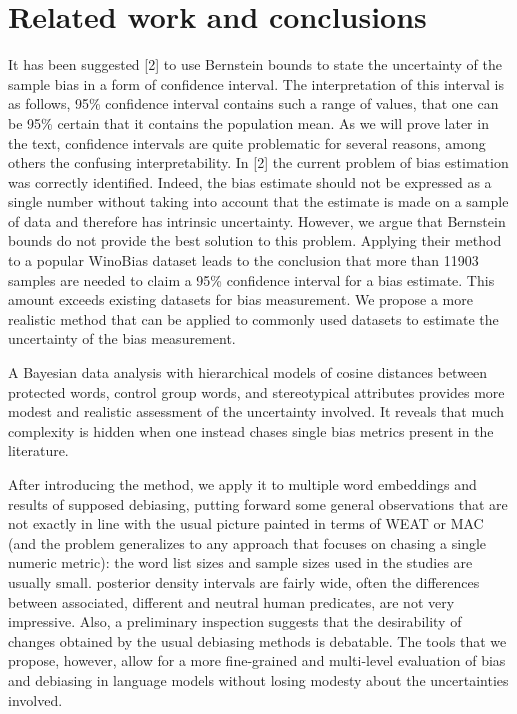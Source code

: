 \documentclass[
  12pt,
  dvipsnames,enabledeprecatedfontcommands]{scrartcl}
\begin{document}
\hypertarget{related-work-and-conclusions}{%
\section{Related work and
conclusions}\label{related-work-and-conclusions}}

\label{sec:related}

It has been suggested {[}2{]} to use Bernstein bounds to state the
uncertainty of the sample bias in a form of confidence interval. The
interpretation of this interval is as follows, 95\% confidence interval
contains such a range of values, that one can be 95\% certain that it
contains the population mean. As we will prove later in the text,
confidence intervals are quite problematic for several reasons, among
others the confusing interpretability. In {[}2{]} the current problem of
bias estimation was correctly identified. Indeed, the bias estimate
should not be expressed as a single number without taking into account
that the estimate is made on a sample of data and therefore has
intrinsic uncertainty. However, we argue that Bernstein bounds do not
provide the best solution to this problem. Applying their method to a
popular WinoBias dataset leads to the conclusion that more than 11903
samples are needed to claim a 95\% confidence interval for a bias
estimate. This amount exceeds existing datasets for bias measurement. We
propose a more realistic method that can be applied to commonly used
datasets to estimate the uncertainty of the bias measurement.


A Bayesian data analysis with hierarchical models of cosine distances
between protected words, control group words, and stereotypical
attributes provides more modest and realistic assessment of the
uncertainty involved. It reveals that much complexity is hidden when one
instead chases single bias metrics present in the literature.

After introducing the method, we apply it to multiple word embeddings
and results of supposed debiasing, putting forward some general
observations that are not exactly in line with the usual picture painted
in terms of \textsf{WEAT} or \textsf{MAC} (and the problem generalizes
to any approach that focuses on chasing a single numeric metric): the
word list sizes and sample sizes used in the studies are usually small.
posterior density intervals are fairly wide, often the differences
between associated, different and neutral human predicates, are not very
impressive. Also, a preliminary inspection suggests that the
desirability of changes obtained by the usual debiasing methods is
debatable. The tools that we propose, however, allow for a more
fine-grained and multi-level evaluation of bias and debiasing in
language models without losing modesty about the uncertainties involved.
\end{document}
